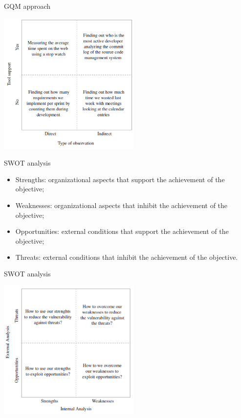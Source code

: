 \documentclass{beamer}
\begin{document}
\begin{frame}{\centerline{GQM approach}}

\begin{center}
\includegraphics[width=70mm]{A2022.IDSEPC.SperimentazioneDeduzione/image-01.png}
\end{center}
\end{frame}
\begin{frame}{\centerline{SWOT analysis}}

\begin{itemize}

\item  Strengths: organizational aspects that support the achievement of the objective;
\item  Weaknesses: organizational aspects that inhibit the achievement of the objective;
\item  Opportunities: external conditions that support the achievement of the objective;
\item  Threats: external conditions that inhibit the achievement of the objective.


\end{itemize}

\end{frame}

\begin{frame}{\centerline{SWOT analysis}}

\begin{center}
\includegraphics[width=70mm]{A2022.IDSEPC.SperimentazioneDeduzione/image-07.png}
\end{center}
\end{frame}
\end{document}
